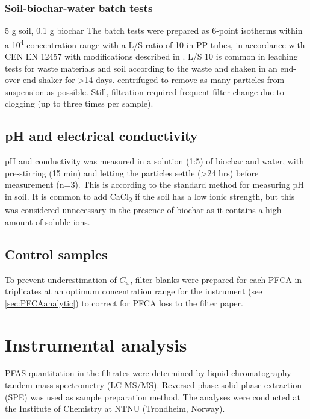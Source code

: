 \subsubsection{Soil-biochar-water batch tests}
5 g soil, 0.1 g biochar
The batch tests were prepared as 6-point isotherms within a 10\textsuperscript{4} concentration range with a L/S ratio of 10 in PP tubes, in accordance with CEN EN 12457 with modifications described in \citep{Hale2017fire,Kupryianchyk2016a}. L/S 10  is common in leaching tests for waste materials and soil according to the waste and shaken in an end-over-end shaker for \textgreater 14 days. 
centrifuged to remove as many particles from suspension as possible. Still, filtration required frequent filter change due to clogging (up to three times per sample).

\subsection{pH and electrical conductivity}
pH and conductivity was measured in a solution (1:5) of biochar and water, with pre-stirring (15 min) and letting the particles settle (\textgreater 24 hrs) before measurement (n=3). This is according to the standard method for measuring pH in soil. It is common to add CaCl\textsubscript{2} if the soil has a low ionic strength, but this was considered unnecessary in the presence of biochar as it contains a high amount of soluble ions. 

\subsection{Control samples}
To prevent underestimation of $C_w$, filter blanks were prepared for each PFCA in triplicates at an optimum concentration range for the instrument (see \cref{sec:PFCAanalytic}) to correct for PFCA loss to the filter paper. 


\section{Instrumental analysis} \label{methods:instrAnalysis}
PFAS quantitation in the filtrates were determined by liquid chromatography--tandem mass spectrometry (LC-MS/MS). Reversed phase solid phase extraction (SPE) was used as sample preparation method. The analyses were conducted at the Institute of Chemistry at NTNU (Trondheim, Norway).

